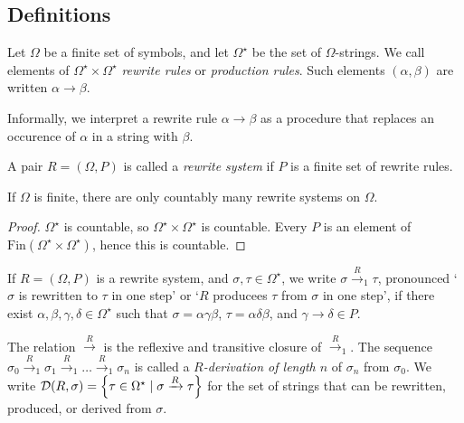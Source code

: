 \subsection{Definitions}
\begin{definition}
	Let \( \Omega \) be a finite set of symbols, and let \( \Omega^\star \) be the set of \( \Omega \)-strings.
	We call elements of \( \Omega^\star \times \Omega^\star \) \emph{rewrite rules} or \emph{production rules}.
	Such elements \( (\alpha, \beta) \) are written \( \alpha \to \beta \).
\end{definition}
Informally, we interpret a rewrite rule \( \alpha \to \beta \) as a procedure that replaces an occurence of \( \alpha \) in a string with \( \beta \).
\begin{definition}
	A pair \( R = (\Omega, P) \) is called a \emph{rewrite system} if \( P \) is a finite set of rewrite rules.
\end{definition}
\begin{proposition}
	If \( \Omega \) is finite, there are only countably many rewrite systems on \( \Omega \).
\end{proposition}
\begin{proof}
	\( \Omega^\star \) is countable, so \( \Omega^\star \times \Omega^\star \) is countable.
	Every \( P \) is an element of \( \mathrm{Fin}(\Omega^\star \times \Omega^\star) \), hence this is countable.
\end{proof}
\begin{definition}
	If \( R = (\Omega, P) \) is a rewrite system, and \( \sigma, \tau \in \Omega^\star \), we write \( \sigma \xrightarrow R_1 \tau \), pronounced `\( \sigma \) is rewritten to \( \tau \) in one step' or `\( R \) producees \( \tau \) from \( \sigma \) in one step', if there exist \( \alpha, \beta, \gamma, \delta \in \Omega^\star \) such that \( \sigma = \alpha \gamma \beta \), \( \tau = \alpha \delta \beta \), and \( \gamma \to \delta \in P \).

	The relation \( \xrightarrow R \) is the reflexive and transitive closure of \( \xrightarrow R_1 \).
	The sequence \( \sigma_0 \xrightarrow R_1 \sigma_1 \xrightarrow R_1 \dots \xrightarrow R_1 \sigma_n \) is called a \emph{\( R \)-derivation of length \( n \)} of \( \sigma_n \) from \( \sigma_0 \).
	We write \( \mathcal D(R, \sigma) = \qty{\tau \in \Omega^\star \mid \sigma \xrightarrow R \tau} \) for the set of strings that can be rewritten, produced, or derived from \( \sigma \).
\end{definition}


